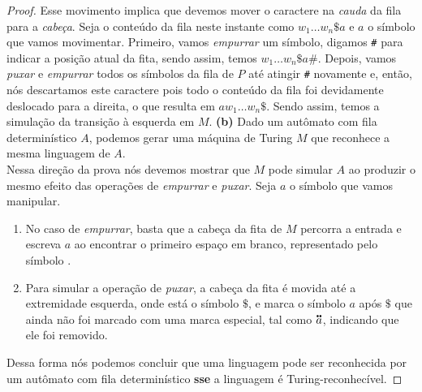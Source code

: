 \begin{proof}
Esse movimento implica que devemos mover o caractere na \textit{cauda} da fila para a \textit{cabeça}.
Seja o conteúdo da fila neste instante como $w_1 \ldots  w_n\$a$ e $a$ o símbolo que vamos movimentar. Primeiro, vamos \textit{empurrar} um símbolo, digamos \texttt{\#} para indicar a posição atual da fita, sendo assim, temos $w_1 \ldots  w_n\$a\texttt{\#}$. Depois, vamos \textit{puxar} e \textit{empurrar} todos os símbolos da fila de $P$ até atingir \texttt{\#} novamente e, então, nós descartamos este caractere pois todo o conteúdo da fila foi devidamente deslocado para a direita, o que resulta em $aw_1 \ldots  w_n\$$. Sendo assim, temos a simulação da transição à esquerda em $M$.
\vskip 0.1in
\textbf{(b)} Dado um autômato com fila determinístico $A$, podemos gerar uma máquina de Turing $M$ que reconhece a mesma linguagem de $A$.\\[3pt]
Nessa direção da prova nós devemos mostrar que $M$ pode simular $A$ ao produzir o mesmo efeito das operações de \textit{empurrar} e \textit{puxar}. Seja $a$ o símbolo que vamos manipular.
\begin{enumerate}
\item No caso de \textit{empurrar}, basta que a cabeça da fita de $M$ percorra a entrada e escreva $a$ ao encontrar o primeiro espaço em branco, representado pelo símbolo \textvisiblespace.
\item Para simular a operação de \textit{puxar}, a cabeça da fita é movida até a extremidade esquerda, onde está o símbolo $\$$, e marca o símbolo $a$ após $\$$ que ainda não foi marcado com uma marca especial, tal como $\accentset{\mbox{\large\bfseries .\hspace{-0.25ex}.}}{a}$, indicando que ele foi removido.
\end{enumerate}

Dessa forma nós podemos concluir que uma linguagem pode ser reconhecida por um autômato com fila determinístico \textbf{sse} a linguagem é Turing-reconhecível.

\end{proof}